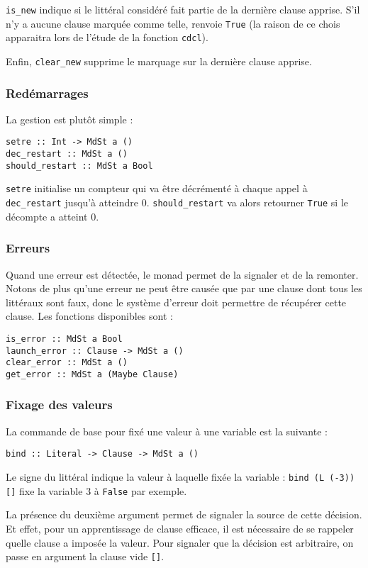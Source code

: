 \texttt{is\_new} indique si le littéral considéré fait partie de la dernière
clause apprise. S'il n'y a aucune clause marquée comme telle, renvoie
\texttt{True} (la raison de ce chois apparaitra lors de l'étude de la fonction
\texttt{cdcl}).

Enfin, \texttt{clear\_new} supprime le marquage sur la dernière clause apprise.

\subsubsection{Redémarrages}
La gestion est plutôt simple :
\begin{lstlisting}
setre :: Int -> MdSt a ()
dec_restart :: MdSt a ()
should_restart :: MdSt a Bool
\end{lstlisting}

\texttt{setre} initialise un compteur qui va être décrémenté à chaque appel à
\texttt{dec\_restart} jusqu'à atteindre $0$. \texttt{should\_restart} va alors
retourner \texttt{True} si le décompte a atteint $0$.

\subsubsection{Erreurs}
Quand une erreur est détectée, le monad permet de la signaler et de la
remonter. Notons de plus qu'une erreur ne peut être causée que par une clause
dont tous les littéraux sont faux, donc le système d'erreur doit permettre
de récupérer cette clause. Les fonctions disponibles sont :
\begin{lstlisting}
is_error :: MdSt a Bool
launch_error :: Clause -> MdSt a ()
clear_error :: MdSt a ()
get_error :: MdSt a (Maybe Clause)
\end{lstlisting}

\subsubsection{Fixage des valeurs}
La commande de base pour fixé une valeur à une variable est la suivante :
\begin{lstlisting}
bind :: Literal -> Clause -> MdSt a ()
\end{lstlisting}

Le signe du littéral indique la valeur à laquelle fixée la variable :
\texttt{bind (L (-3)) []} fixe la variable $3$ à \texttt{False} par exemple.

La présence du deuxième argument permet de signaler la source de cette
décision. Et effet, pour un apprentissage de clause efficace, il est nécessaire
de se rappeler quelle clause a imposée la valeur. Pour signaler que la
décision est arbitraire, on passe en argument la clause vide \texttt{[]}.

